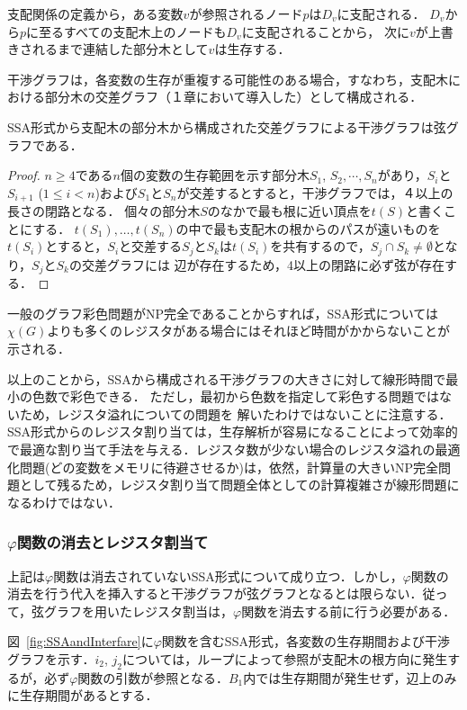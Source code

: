\documentclass[dvipdfmx,a4j]{jbook}
\begin{document}
支配関係の定義から，ある変数$v$が参照されるノード$p$は$D_v$に支配される．
$D_v$から$p$に至るすべての支配木上のノードも$D_v$に支配されることから，
次に$v$が上書きされるまで連結した部分木として$v$は生存する．

干渉グラフは，各変数の生存が重複する可能性のある場合，すなわち，支配木における部分木の交差グラフ（１章において導入した）として構成される．

\begin{Lem}
    SSA形式から支配木の部分木から構成された交差グラフによる干渉グラフは弦グラフである．
\end{Lem}

\begin{proof}
$n\geq 4$である$n$個の変数の生存範囲を示す部分木$S_1$, $S_2,\cdots,S_n$があり，$S_i$と$S_{i+1}$ ($1\leq i< n$)および$S_1$と$S_n$が交差するとすると，干渉グラフでは，４以上の長さの閉路となる．
個々の部分木$S$のなかで最も根に近い頂点を$t(S)$と書くことにする．
$t(S_1),\ldots,t(S_n)$の中で最も支配木の根からのパスが遠いものを
$t(S_i)$とすると，$S_i$と交差する$S_j$と$S_k$は$t(S_i)$を共有するので，$S_j\cap S_k\not=\emptyset$となり，$S_j$と$S_k$の交差グラフには
辺が存在するため，4以上の閉路に必ず弦が存在する．
\end{proof}

一般のグラフ彩色問題がNP完全であることからすれば，SSA形式については$\chi(G)$よりも多くのレジスタがある場合にはそれほど時間がかからないことが示される．

以上のことから，SSAから構成される干渉グラフの大きさに対して線形時間で最小の色数で彩色できる．
ただし，最初から色数を指定して彩色する問題ではないため，レジスタ溢れについての問題を
解いたわけではないことに注意する．SSA形式からのレジスタ割り当ては，生存解析が容易になることによって効率的で最適な割り当て手法を与える．レジスタ数が少ない場合のレジスタ溢れの最適化問題(どの変数をメモリに待避させるか)は，依然，計算量の大きいNP完全問題として残るため，レジスタ割り当て問題全体としての計算複雑さが線形問題になるわけではない．

\subsubsection{$\varphi$関数の消去とレジスタ割当て}

上記は$\varphi$関数は消去されていないSSA形式について成り立つ．しかし，$\varphi$関数の消去を行う代入を挿入すると干渉グラフが弦グラフとなるとは限らない．従って，弦グラフを用いたレジスタ割当は，$\varphi$関数を消去する前に行う必要がある．

図~\ref{fig:SSAandInterfare}に$\varphi$関数を含むSSA形式，各変数の生存期間および干渉グラフを示す．$i_2$, $j_2$については，ループによって参照が支配木の根方向に発生するが，必ず$\varphi$関数の引数が参照となる．$B_1$内では生存期間が発生せず，辺上のみに生存期間があるとする．
\end{document}

